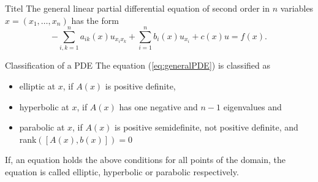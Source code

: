 \begin{defn}{Titel}
	The general linear partial differential equation of second order in $n$ variables $x=(x_1,\ldots,x_n)$ has the form
	\begin{equation}
		-\sum_{ i, k = 1 }^n a_{ ik } (x) u_{ x_i x_k } + \sum_{ i = 1 }^n b_i (x) u_{ x_i } + c (x) u = f (x).
		\label{eq:generalPDE}
	\end{equation}
\end{defn}

\begin{defn}{Classification of a PDE}
	The equation (\ref{eq:generalPDE}) is classified as
		\begin{itemize}
			\item elliptic at $x$, if $A(x)$ is positive definite,
			\item hyperbolic at $x$, if $A(x)$ has one negative and $n-1$ eigenvalues and
			\item parabolic at $x$, if $A(x)$ is positive semidefinite, not positive definite, and rank$([A(x), b(x)])=0$  
		\end{itemize}
	
	If, an equation holds the above conditions for all points of the domain, the equation is called elliptic, hyperbolic or parabolic respectively. 
	\end{defn}
